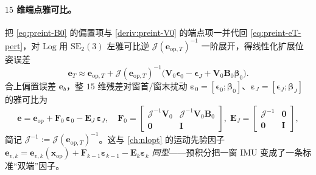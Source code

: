 \paragraph{$15$ 维端点雅可比。}
把 \cref{eq:preint-B0} 的偏置项与 \cref{deriv:preint-V0} 的端点项一并代回 \cref{eq:preint-eT-pert}，对 $\mathrm{Log}$ 用 $\mathrm{SE}_2(3)$ 左雅可比逆 $\boldsymbol{\mathcal{J}}(\mathbf{e}_{\mathrm{op},T})^{-1}$ 一阶展开，得线性化扩展位姿误差
\begin{equation}
  \mathbf{e}_T\approx\mathbf{e}_{\mathrm{op},T}+\boldsymbol{\mathcal{J}}(\mathbf{e}_{\mathrm{op},T})^{-1}\big(\mathbf{V}_0\boldsymbol{\epsilon}_0-\boldsymbol{\epsilon}_J+\mathbf{V}_0\mathbf{B}_0\boldsymbol{\beta}_0\big).
  \label{eq:preint-eT-lin}
\end{equation}
合上偏置误差 $\mathbf{e}_b$，整 $15$ 维残差对窗首/窗末扰动 $\boldsymbol{\varepsilon}_0=[\boldsymbol{\epsilon}_0;\boldsymbol{\beta}_0]$、$\boldsymbol{\varepsilon}_J=[\boldsymbol{\epsilon}_J;\boldsymbol{\beta}_J]$ 的雅可比为
\begin{equation}
  \mathbf{e}=\mathbf{e}_{\mathrm{op}}+\mathbf{F}_0\,\boldsymbol{\varepsilon}_0-\mathbf{E}_J\,\boldsymbol{\varepsilon}_J,\quad
  \mathbf{F}_0=\begin{bmatrix}\boldsymbol{\mathcal{J}}^{-1}\mathbf{V}_0&\boldsymbol{\mathcal{J}}^{-1}\mathbf{V}_0\mathbf{B}_0\\\mathbf{0}&\mathbf{I}\end{bmatrix},\;
  \mathbf{E}_J=\begin{bmatrix}\boldsymbol{\mathcal{J}}^{-1}&\mathbf{0}\\\mathbf{0}&\mathbf{I}\end{bmatrix},
  \label{eq:preint-FE}
\end{equation}
简记 $\boldsymbol{\mathcal{J}}^{-1}:=\boldsymbol{\mathcal{J}}(\mathbf{e}_{\mathrm{op},T})^{-1}$。这与 \cref{ch:nlopt} 的运动先验因子 $\mathbf{e}_{v,k}=\mathbf{e}_{v,k}(\mathbf{x}_{\mathrm{op}})+\mathbf{F}_{k-1}\boldsymbol{\varepsilon}_{k-1}-\mathbf{E}_k\boldsymbol{\varepsilon}_k$ \emph{同型}——预积分把一窗 IMU 变成了一条标准“双端”因子。

